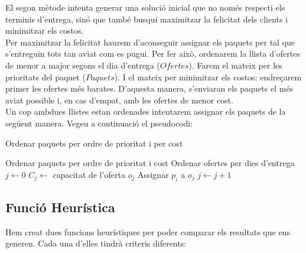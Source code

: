 \documentclass[a4paper]{article}
\begin{document}
	El segon mètode intenta generar una solució inicial que no només respecti els terminis d'entrega, sinó que també busqui maximitzar la felicitat dels clients i minimitzar els costos. \\
	
	Per maximitzar la felicitat haurem d'aconseguir assignar els paquets per tal que s'entreguin tots tan aviat com es pugui. Per fer això, ordenarem la llista d'ofertes de menor a major segons el dia d'entrega ($Ofertes$). Farem el mateix per les prioritats del paquet ($Paquets$). I el mateix per minimitzar els costos: endreçarem primer les ofertes més barates. D'aquesta manera, s'enviaran els paquets el més aviat possible i, en cas d'empat, amb les ofertes de menor cost. \\
	
	Un cop ambdues llistes estan ordenades intentarem assignar els paquets de la següent manera. Vegeu a continuació el pseudocodi:
	
	\begin{algorithm} [H]
		\caption{Ordenar paquets per ordre de prioritat i per cost}
		\begin{algorithmic}[1]
			\State Ordenar paquets per ordre de prioritat i cost
			\State Ordenar ofertes per dies d'entrega
			\State $j \gets 0$
			\State $C_j \gets$ capacitat de l'oferta $o_j$
			\State Assignar $p_i$ a $o_j$
			\Else
			\State $j \gets j + 1$ 
			\EndIf
			\EndWhile
			\EndFor
		\end{algorithmic}
	\end{algorithm}
		
	\subsection{Funció Heurística}
	
	Hem creat dues funcions heurístiques per poder comparar els resultats que ens generen. Cada una d'elles tindrà criteris diferents:
	
\end{document}
